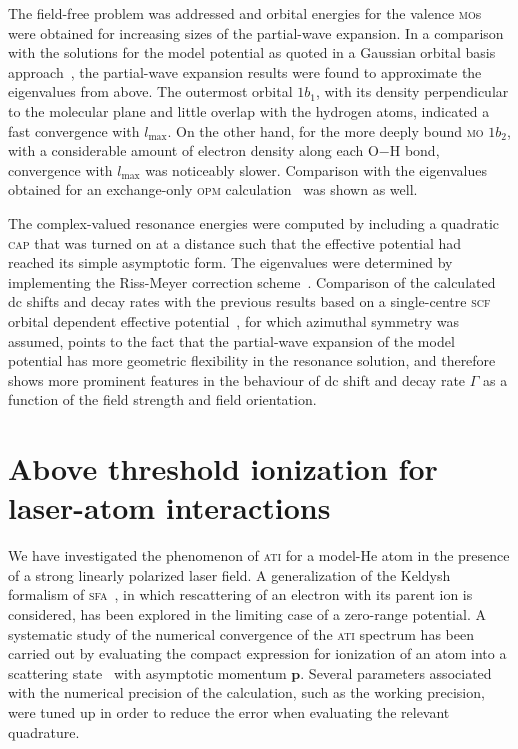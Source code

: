 The field-free problem was addressed and orbital energies for the
valence \textsc{mo}s were obtained for increasing sizes of the
partial-wave expansion. In a comparison with the solutions for the
model potential as quoted in a Gaussian orbital basis
approach~\cite{illescas_2015}, the partial-wave expansion results were
found to approximate the eigenvalues from above. The outermost orbital
$1b_{1}$, with its density perpendicular to the molecular plane and
little overlap with the hydrogen atoms, indicated a fast convergence
with $l_{\mathrm{max}}$. On the other hand, for the more deeply bound
\textsc{mo} $1b_{2}$, with a considerable amount of electron density
along each O$-$H bond, convergence with $l_{\mathrm{max}}$ was
noticeably slower. Comparison with the eigenvalues obtained for an
exchange-only \textsc{opm} calculation~\cite{opm_2007} was shown as
well.

The complex-valued resonance energies were computed by including a
quadratic \textsc{cap} that was turned on at a distance such that the
effective potential had reached its simple asymptotic form. The
eigenvalues were determined by implementing the Riss-Meyer correction
scheme~\cite{RissMeyer_1993}. Comparison of the calculated dc shifts
and decay rates with the previous results based on a single-centre
\textsc{scf} orbital dependent effective
potential~\cite{sarias_2016,sarias_2017}, for which azimuthal symmetry
was assumed, points to the fact that the partial-wave expansion of the
model potential has more geometric flexibility in the resonance
solution, and therefore shows more prominent features in the behaviour
of dc shift and decay rate $\Gamma$ as a function of the field
strength and field orientation.


\section{Above threshold ionization for laser-atom interactions}
\label{ch:ati_results}

We have investigated the phenomenon of \textsc{ati} for a model-He
atom in the presence of a strong linearly polarized laser field. A
generalization of the Keldysh formalism of
\textsc{sfa}~\cite{KeldyshSFA}, in which rescattering of an electron
with its parent ion is considered, has been explored in the limiting
case of a zero-range potential. A systematic study of the numerical
convergence of the \textsc{ati} spectrum has been carried out by
evaluating the compact expression for ionization of an atom into a
scattering state~\cite{Kopold_1997sfa} with asymptotic momentum
$\mathbf{p}$. Several parameters associated with the numerical
precision of the calculation, such as the working precision, were
tuned up in order to reduce the error when evaluating the relevant
quadrature.


